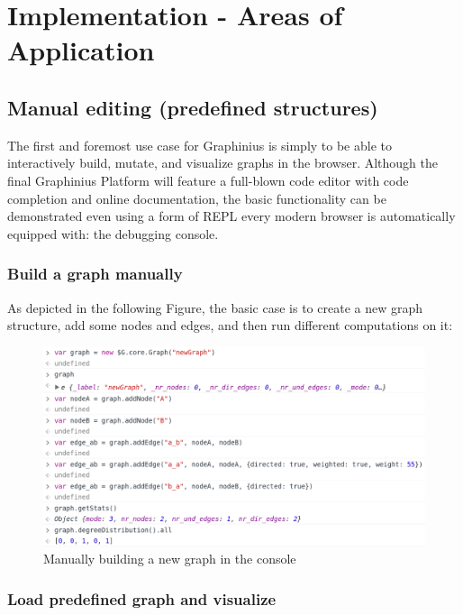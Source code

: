 \chapter{Implementation - Areas of Application}
\label{ch:impl_aoa}


\section{Manual editing (predefined structures)}
\label{sect:manual_editing}

	The first and foremost use case for Graphinius is simply to be able to interactively build, mutate, and visualize graphs in the browser. Although the final Graphinius Platform will feature a full-blown code editor with code completion and online documentation, the basic functionality can be demonstrated even using a form of REPL every modern browser is automatically equipped with: the debugging console.

	\subsection{Build a graph manually}
	\label{ssect:build_graph_manually}
	
	As depicted in the following Figure, the basic case is to create a new graph structure, add some nodes and edges, and then run different computations on it:
	
	\begin{figure}[H]
		\begin{center}
			\includegraphics [width=1\textwidth] {figures/buildGraphManually}
			\caption{Manually building a new graph in the console}
			\label{fig:build_graph_manually}
		\end{center}
	\end{figure}
	
	
	\subsection{Load predefined graph and visualize}
	\label{ssect:load_graph}
	
